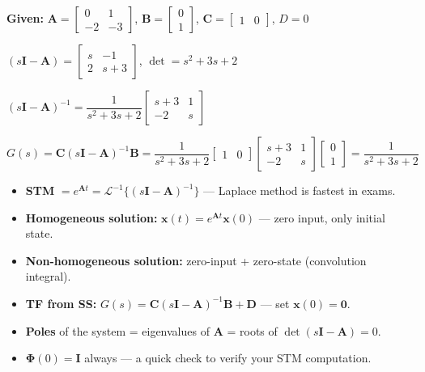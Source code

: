 \documentclass[12pt,a4paper]{article}
\begin{document}
\begin{tcolorbox}[examplebox, title={Example: TF from State Space}]
\textbf{Given:} $\mathbf{A}=\begin{bmatrix}0&1\\-2&-3\end{bmatrix}$, $\mathbf{B}=\begin{bmatrix}0\\1\end{bmatrix}$, $\mathbf{C}=\begin{bmatrix}1&0\end{bmatrix}$, $D=0$

$(s\mathbf{I}-\mathbf{A}) = \begin{bmatrix}s&-1\\2&s+3\end{bmatrix}$, \quad $\det = s^2+3s+2$

$(s\mathbf{I}-\mathbf{A})^{-1} = \dfrac{1}{s^2+3s+2}\begin{bmatrix}s+3&1\\-2&s\end{bmatrix}$

$G(s) = \mathbf{C}(s\mathbf{I}-\mathbf{A})^{-1}\mathbf{B} = \dfrac{1}{s^2+3s+2}\begin{bmatrix}1&0\end{bmatrix}\begin{bmatrix}s+3&1\\-2&s\end{bmatrix}\begin{bmatrix}0\\1\end{bmatrix} = \dfrac{1}{s^2+3s+2}$
\end{tcolorbox}

\begin{tcolorbox}[exambox, title={Exam Tips --- State Space \& STM}]
\begin{itemize}[leftmargin=*, itemsep=3pt, topsep=0pt]
  \item \textbf{STM} $= e^{\mathbf{A}t} = \mathcal{L}^{-1}\{(s\mathbf{I}-\mathbf{A})^{-1}\}$ --- Laplace method is fastest in exams.
  \item \textbf{Homogeneous solution:} $\mathbf{x}(t) = e^{\mathbf{A}t}\mathbf{x}(0)$ --- zero input, only initial state.
  \item \textbf{Non-homogeneous solution:} zero-input + zero-state (convolution integral).
  \item \textbf{TF from SS:} $G(s) = \mathbf{C}(s\mathbf{I}-\mathbf{A})^{-1}\mathbf{B} + \mathbf{D}$ --- set $\mathbf{x}(0)=\mathbf{0}$.
  \item \textbf{Poles} of the system = eigenvalues of $\mathbf{A}$ = roots of $\det(s\mathbf{I}-\mathbf{A})=0$.
  \item \textbf{$\boldsymbol{\Phi}(0) = \mathbf{I}$} always --- a quick check to verify your STM computation.
\end{itemize}
\end{tcolorbox}
\end{document}
